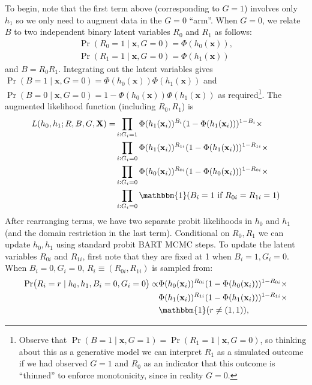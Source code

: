 \documentclass[aoas,preprint, 11pt, dvipsnames, table, x11name]{imsart}
\newcommand{\ind}[1]{\mathbbm{1}({#1})}%
\theoremstyle{remark}
\begin{document}
To begin, note that the first term above (corresponding to $G=1$) involves only $h_1$ so we only need to augment data in the $G=0$ ``arm''. When $G=0$, we relate $B$ to two independent binary latent variables $R_0$ and $R_1$  as follows:
\begin{gather*}
    \Pr(R_0=1\mid\mathbf{x}, G=0) = \Phi(h_0(\mathbf{x})),\\
     \Pr(R_1=1\mid\mathbf{x}, G=0) = \Phi(h_1(\mathbf{x}))\label{eq:Rprobs}
\end{gather*}
and $B = R_0R_1$. Integrating out the latent variables gives $\Pr(B=1\mid\mathbf{x}, G=0) = \Phi(h_0(\mathbf{x}))\Phi(h_1(\mathbf{x}))$ and $\Pr(B=0\mid\mathbf{x}, G=0) = 1-\Phi(h_0(\mathbf{x}))\Phi(h_1(\mathbf{x}))$ as required\footnote{Observe that $\Pr(B=1\mid\mathbf{x}, G=1) = \Pr(R_1=1\mid\mathbf{x}, G=0)$, so thinking about this as a generative model we can interpret $R_1$ as a simulated outcome if we had observed $G=1$ and $R_0$ as an indicator that this outcome is ``thinned'' to enforce monotonicity, since in reality $G=0$.}. 
The augmented likelihood function (including $R_0, R_1$) is 
\begin{equation}
\begin{split}
L(h_0, h_1; R, B, G, \mathbf{X}) =&\prod_{i: G_i=1}\Phi(h_1(\mathbf{x}_i))^{B_i}(1-\Phi(h_1(\mathbf{x}_i)))^{1-B_i} \times \\
&\prod_{i: G_i=0} \Phi(h_1(\mathbf{x}_i))^{R_{1i}}(1-\Phi(h_1(\mathbf{x}_i)))^{1-R_{1i}}\times \\
&\prod_{i: G_i=0}\Phi(h_0(\mathbf{x}_i))^{R_{0i}}(1-\Phi(h_0(\mathbf{x}_i)))^{1-R_{0i}}\times\\
&\prod_{i: G_i=0}\ind{B_i = 1\text{ if }R_{0i}=R_{1i}=1} 
\label{eq:bart-da1}
\end{split}
\end{equation}
After rearranging terms, we have two separate probit likelihoods in $h_0$ and $h_1$ (and the domain restriction in the last term). Conditional on $R_0, R_1$ we can update $h_0, h_1$ using standard probit BART MCMC steps. To update the latent variables $R_{0i}$ and $R_{1i}$, first note that they are fixed at 1 when $B_i=1, G_i=0$. When $B_i=0, G_i=0$, $R_i\equiv (R_{0i}, R_{1i})$ is sampled from:
\begin{equation}
\begin{split}
\Pr(R_i=r\mid h_0, h_1, B_i=0, G_i=0)\propto
&\Phi(h_0(\mathbf{x}_i))^{R_{0i}}(1-\Phi(h_0(\mathbf{x}_i)))^{1-R_{0i}}\times\\
&\Phi(h_1(\mathbf{x}_i))^{R_{1i}}(1-\Phi(h_1(\mathbf{x}_i)))^{1-R_{1i}}\times \\
&\ind{r\neq (1,1)},
\end{split}
\end{equation}
\end{document}
